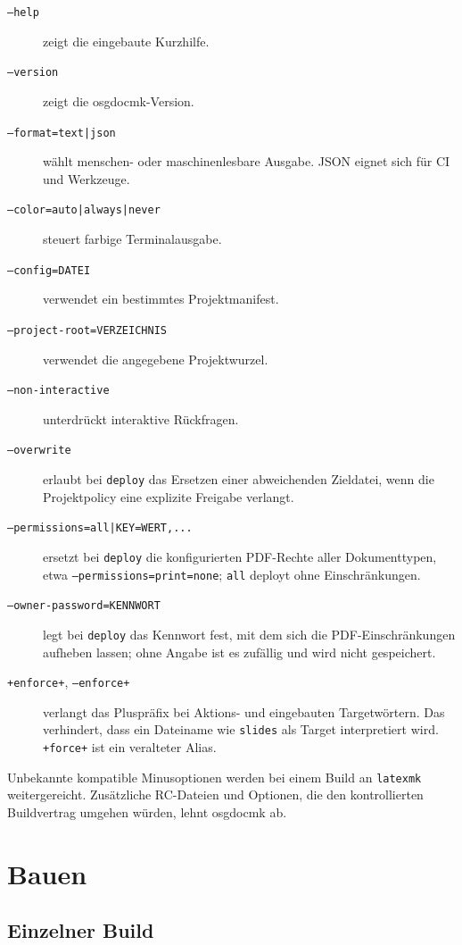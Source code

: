\documentclass[
load-preamble+
]{osgdoc}
\begin{document}
\begin{description}
\item[\texttt{--help}] zeigt die eingebaute Kurzhilfe.
\item[\texttt{--version}] zeigt die osgdocmk-Version.
\item[\texttt{--format=text|json}] wählt menschen- oder maschinenlesbare
  Ausgabe. JSON eignet sich für CI und Werkzeuge.
\item[\texttt{--color=auto|always|never}] steuert farbige Terminalausgabe.
\item[\texttt{--config=DATEI}] verwendet ein bestimmtes Projektmanifest.
\item[\texttt{--project-root=VERZEICHNIS}] verwendet die angegebene
  Projektwurzel.
\item[\texttt{--non-interactive}] unterdrückt interaktive Rückfragen.
\item[\texttt{--overwrite}] erlaubt bei \texttt{deploy} das Ersetzen einer
  abweichenden Zieldatei, wenn die Projektpolicy eine explizite Freigabe
  verlangt.
\item[\texttt{--permissions=all|KEY=WERT,...}] ersetzt bei \texttt{deploy}
  die konfigurierten PDF-Rechte aller Dokumenttypen, etwa
  \texttt{--permissions=print=none}; \texttt{all} deployt ohne
  Einschränkungen.
\item[\texttt{--owner-password=KENNWORT}] legt bei \texttt{deploy} das
  Kennwort fest, mit dem sich die PDF-Einschränkungen aufheben lassen; ohne
  Angabe ist es zufällig und wird nicht gespeichert.
\item[\texttt{+enforce+}, \texttt{--enforce+}] verlangt das Pluspräfix bei
  Aktions- und eingebauten Targetwörtern. Das verhindert, dass ein Dateiname
  wie \texttt{slides} als Target interpretiert wird. \texttt{+force+} ist ein
  veralteter Alias.
\end{description}

Unbekannte kompatible Minusoptionen werden bei einem Build an \texttt{latexmk}
weitergereicht. Zusätzliche RC-Dateien und Optionen, die den kontrollierten
Buildvertrag umgehen würden, lehnt osgdocmk ab.

\section{Bauen}

\subsection{Einzelner Build}
\end{document}
